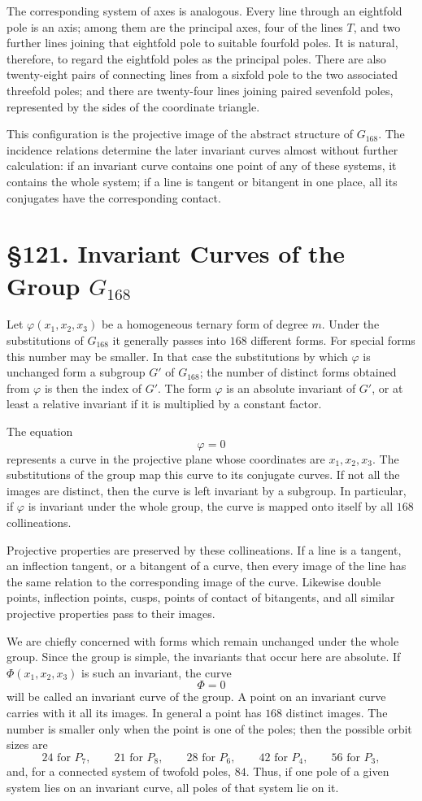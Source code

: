 \documentclass[11pt,a4paper]{book}
\newcommand{\webersection}[2]{\clearpage\section*{\S #1. #2}}
\begin{document}
The corresponding system of axes is analogous.  Every line through an eightfold pole is an axis; among them are the principal axes, four of the lines \(T\), and two further lines joining that eightfold pole to suitable fourfold poles.  It is natural, therefore, to regard the eightfold poles as the principal poles.  There are also twenty-eight pairs of connecting lines from a sixfold pole to the two associated threefold poles; and there are twenty-four lines joining paired sevenfold poles, represented by the sides of the coordinate triangle.

This configuration is the projective image of the abstract structure of \(G_{168}\).  The incidence relations determine the later invariant curves almost without further calculation: if an invariant curve contains one point of any of these systems, it contains the whole system; if a line is tangent or bitangent in one place, all its conjugates have the corresponding contact.

\webersection{121}{Invariant Curves of the Group \(G_{168}\)}

Let \(\varphi(x_1,x_2,x_3)\) be a homogeneous ternary form of degree \(m\).  Under the substitutions of \(G_{168}\) it generally passes into \(168\) different forms.  For special forms this number may be smaller.  In that case the substitutions by which \(\varphi\) is unchanged form a subgroup \(G'\) of \(G_{168}\); the number of distinct forms obtained from \(\varphi\) is then the index of \(G'\).  The form \(\varphi\) is an absolute invariant of \(G'\), or at least a relative invariant if it is multiplied by a constant factor.

The equation
\[
 \varphi=0
\]
represents a curve in the projective plane whose coordinates are \(x_1,x_2,x_3\).  The substitutions of the group map this curve to its conjugate curves.  If not all the images are distinct, then the curve is left invariant by a subgroup.  In particular, if \(\varphi\) is invariant under the whole group, the curve is mapped onto itself by all \(168\) collineations.

Projective properties are preserved by these collineations.  If a line is a tangent, an inflection tangent, or a bitangent of a curve, then every image of the line has the same relation to the corresponding image of the curve.  Likewise double points, inflection points, cusps, points of contact of bitangents, and all similar projective properties pass to their images.

We are chiefly concerned with forms which remain unchanged under the whole group.  Since the group is simple, the invariants that occur here are absolute.  If \(\Phi(x_1,x_2,x_3)\) is such an invariant, the curve
\[
 \Phi=0
\]
will be called an invariant curve of the group.  A point on an invariant curve carries with it all its images.  In general a point has \(168\) distinct images.  The number is smaller only when the point is one of the poles; then the possible orbit sizes are
\[
24\text{ for }P_7,
\qquad 21\text{ for }P_8,
\qquad 28\text{ for }P_6,
\qquad 42\text{ for }P_4,
\qquad 56\text{ for }P_3,
\]
and, for a connected system of twofold poles, \(84\).  Thus, if one pole of a given system lies on an invariant curve, all poles of that system lie on it.
\end{document}
